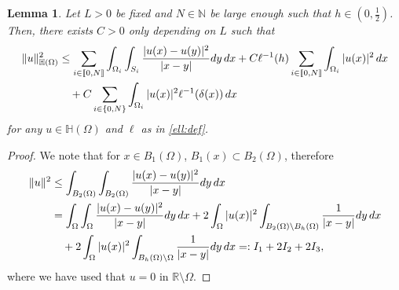 \documentclass[10 pt]{article}
\newcommand\inter[1]{\llbracket #1\rrbracket}
\newtheorem{lemma}[theorem]{Lemma}
\numberwithin{equation}{section}
\def\R{\mathbb{R}}
\begin{document}
\begin{lemma}\label{lem:localization_enorm}
Let $L>0$ be fixed and $N\in\mathbb N$ be large enough such that $h\in(0,\frac{1}{2})$. Then, there exists $C>0$ only depending on $L$ such that 
   \begin{align}\notag
    \|u\|^2_{\mathbb H(\Omega)} &\leq \sum_{i\in\inter{0,N}}\int_{\Omega_i}\int_{S_i}\frac{|u(x)-u(y)|^2}{|x-y|}dy\,dx+C\ell^{-1}(h)\sum_{i\in\inter{0,N}}\int_{\Omega_i}|u(x)|^2\,dx\\
    &\quad +C\sum_{i\in\{0,N\}}\int_{\Omega_i}|u(x)|^2\ell^{-1}(\delta(x))\,dx
\end{align}
for any $u\in \mathbb{H}(\Omega)$ and $\ell$ as in \eqref{ell:def}.
\end{lemma}
\begin{proof}
We note that for $x\in B_1(\Omega)$, $B_1(x)\subset B_2(\Omega)$, therefore
%
\begin{align}\notag
    \|u\|^2&\leq \int_{B_2(\Omega)}\int_{B_2(\Omega)}\frac{|u(x)-u(y)|^2}{|x-y|}dy\, dx\\ \notag
    &=\int_{\Omega}\int_{\Omega}\frac{|u(x)-u(y)|^2}{|x-y|}dy\,dx+2\int_{\Omega}|u(x)|^2\int_{B_2(\Omega)\setminus B_h(\Omega)}\frac{1}{|x-y|}dy\,dx \\ \label{eq:part_init}
    &\quad +2\int_{\Omega}|u(x)|^2\int_{B_h(\Omega)\setminus \Omega}\frac{1}{|x-y|}dy\,dx =: I_1+2I_2+2I_3,
\end{align}
%
where we have used that $u=0$ in $\R\setminus \Omega$. 


\end{proof}
\end{document}
